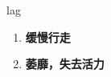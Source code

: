 
\begin{frame}
{\huge lag}
\begin{center}
\begin{enumerate}\Large
  \item \textbf{缓慢行走}
  \item \textbf{萎靡，失去活力}
\end{enumerate}
\end{center}
\end{frame}

